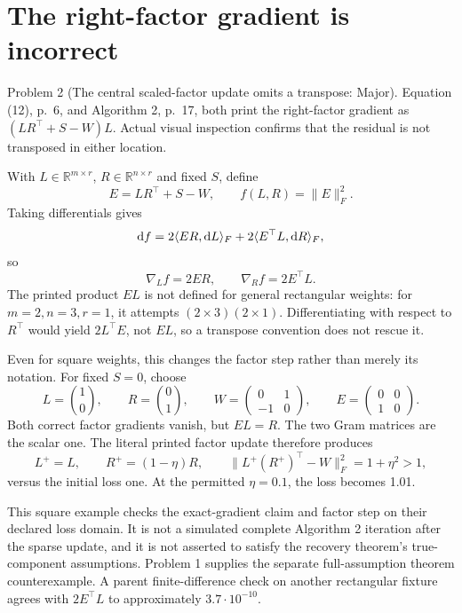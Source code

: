 \documentclass[10pt]{article}
\begin{document}
\section*{The right-factor gradient is incorrect}
Problem 2 (The central scaled-factor update omits a transpose: Major).  Equation (12), p. 6, and Algorithm 2, p. 17, both print the right-factor gradient as \((LR^\top+S-W)L\). Actual visual inspection confirms that the residual is not transposed in either location.\par
With \(L\in\mathbb R^{m\times r}\), \(R\in\mathbb R^{n\times r}\) and fixed \(S\), define \[E=LR^\top+S-W,\qquad f(L,R)=\|E\|_F^2.\] Taking differentials gives \[{\rm d}f
=2\langle ER,{\rm d}L\rangle_F
 +2\langle E^\top L,{\rm d}R\rangle_F,\] so \[\nabla_Lf=2ER,\qquad \nabla_Rf=2E^\top L.\] The printed product \(EL\) is not defined for general rectangular weights: for \(m=2,n=3,r=1\), it attempts \((2\times3)(2\times1)\). Differentiating with respect to \(R^\top\) would yield \(2L^\top E\), not \(EL\), so a transpose convention does not rescue it.\par
Even for square weights, this changes the factor step rather than merely its notation. For fixed \(S=0\), choose \[L=\binom10,\qquad R=\binom01,\qquad
W=\begin{pmatrix}0&1\\-1&0\end{pmatrix},
\qquad E=\begin{pmatrix}0&0\\1&0\end{pmatrix}.\] Both correct factor gradients vanish, but \(EL=R\). The two Gram matrices are the scalar one. The literal printed factor update therefore produces \[L^+=L,\qquad R^+=(1-\eta)R,\qquad
\|L^+(R^+)^\top-W\|_F^2=1+\eta^2>1,\] versus the initial loss one. At the permitted \(\eta=0.1\), the loss becomes 1.01.\par
This square example checks the exact-gradient claim and factor step on their declared loss domain. It is not a simulated complete Algorithm 2 iteration after the sparse update, and it is not asserted to satisfy the recovery theorem’s true-component assumptions. Problem 1 supplies the separate full-assumption theorem counterexample. A parent finite-difference check on another rectangular fixture agrees with \(2E^\top L\) to approximately \(3.7\cdot10^{-10}\).\par
\end{document}
